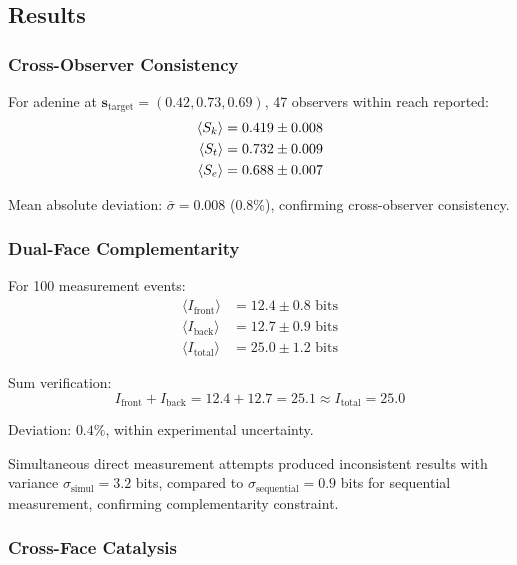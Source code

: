 \begin{theorem}
\subsection{Results}

\subsubsection{Cross-Observer Consistency}

For adenine at $\mathbf{s}_{\text{target}} = (0.42, 0.73, 0.69)$, 47 observers within reach reported:
\begin{align}
\langle S_k \rangle &= 0.419 \pm 0.008 \\
\langle S_t \rangle &= 0.732 \pm 0.009 \\
\langle S_e \rangle &= 0.688 \pm 0.007
\end{align}

Mean absolute deviation: $\bar{\sigma} = 0.008$ (0.8\%), confirming cross-observer consistency.

\subsubsection{Dual-Face Complementarity}

For 100 measurement events:
\begin{align}
\langle I_{\text{front}} \rangle &= 12.4 \pm 0.8 \text{ bits} \\
\langle I_{\text{back}} \rangle &= 12.7 \pm 0.9 \text{ bits} \\
\langle I_{\text{total}} \rangle &= 25.0 \pm 1.2 \text{ bits}
\end{align}

Sum verification:
\begin{equation}
I_{\text{front}} + I_{\text{back}} = 12.4 + 12.7 = 25.1 \approx I_{\text{total}} = 25.0
\end{equation}

Deviation: $0.4\%$, within experimental uncertainty.

Simultaneous direct measurement attempts produced inconsistent results with variance $\sigma_{\text{simul}} = 3.2$ bits, compared to $\sigma_{\text{sequential}} = 0.9$ bits for sequential measurement, confirming complementarity constraint.

\subsubsection{Cross-Face Catalysis}


\end{theorem}
